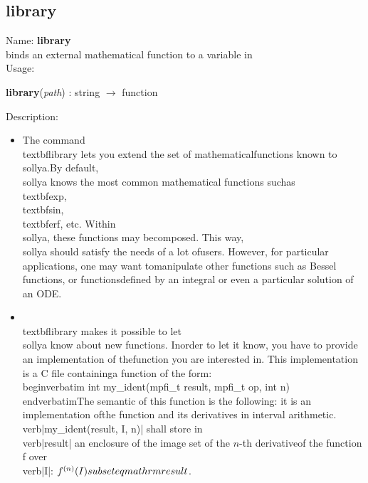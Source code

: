 \subsection{library}
\label{lablibrary}
\noindent Name: \textbf{library}\\
binds an external mathematical function to a variable in \sollya\\
\noindent Usage: 
\begin{center}
\textbf{library}(\emph{path}) : \textsf{string} $\rightarrow$ \textsf{function}\\
\end{center}
\noindent Description: \begin{itemize}

\item The command \\textbf{library} lets you extend the set of mathematical\n   functions known to \\sollya.\n   By default, \\sollya knows the most common mathematical functions such\n   as \\textbf{exp}, \\textbf{sin}, \\textbf{erf}, etc. Within \\sollya, these functions may be\n   composed. This way, \\sollya should satisfy the needs of a lot of\n   users. However, for particular applications, one may want to\n   manipulate other functions such as Bessel functions, or functions\n   defined by an integral or even a particular solution of an ODE.\n
\item \\textbf{library} makes it possible to let \\sollya know about new functions. In\n   order to let it know, you have to provide an implementation of the\n   function you are interested in. This implementation is a C file containing\n   a function of the form:\n   \\begin{verbatim} int my_ident(mpfi_t result, mpfi_t op, int n)\\end{verbatim}\n   The semantic of this function is the following: it is an implementation of\n   the function and its derivatives in interval arithmetic.\n   \\verb|my_ident(result, I, n)| shall store in \\verb|result| an enclosure \n   of the image set of the $n$-th derivative\n   of the function f over \\verb|I|: $f^{(n)}(I) \\subseteq \\mathrm{result}$.\n

\end{itemize}
